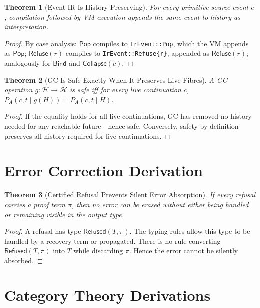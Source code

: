 \documentclass[12pt, a4paper, openany]{book}
\theoremstyle{plain}
\newtheorem{theorem}{Theorem}[chapter]
\theoremstyle{definition}
\theoremstyle{remark}
\newcommand{\Pop}{\mathsf{Pop}}
\newcommand{\Refuse}{\mathsf{Refuse}}
\newcommand{\Bind}{\mathsf{Bind}}
\newcommand{\Collapse}{\mathsf{Collapse}}
\newcommand{\calH}{\mathcal{H}}
\newcommand{\Rfsd}{\mathsf{Refused}}
\begin{document}
\begin{theorem}[Event IR Is History-Preserving]
For every primitive source event $e$, compilation followed by VM execution appends
the same event to history as interpretation.
\end{theorem}

\begin{proof}
By case analysis: $\Pop$ compiles to \texttt{IrEvent::Pop}, which the VM appends
as $\Pop$; $\Refuse(r)$ compiles to \texttt{IrEvent::Refuse\{r\}}, appended as
$\Refuse(r)$; analogously for $\Bind$ and $\Collapse(c)$.
\end{proof}

\begin{theorem}[GC Is Safe Exactly When It Preserves Live Fibres]
A GC operation $g : \calH \to \calH$ is safe iff for every live continuation $c$,
$P_A(c, t \mid g(H)) = P_A(c, t \mid H)$.
\end{theorem}

\begin{proof}
If the equality holds for all live continuations, GC has removed no history needed
for any reachable future---hence safe. Conversely, safety by definition preserves
all history required for live continuations.
\end{proof}

\section{Error Correction Derivation}

\begin{theorem}[Certified Refusal Prevents Silent Error Absorption]
If every refusal carries a proof term $\pi$, then no error can be erased without
either being handled or remaining visible in the output type.
\end{theorem}

\begin{proof}
A refusal has type $\Rfsd(T, \pi)$. The typing rules allow this type to be handled
by a recovery term or propagated. There is no rule converting $\Rfsd(T, \pi)$ into
$T$ while discarding $\pi$. Hence the error cannot be silently absorbed.
\end{proof}

\section{Category Theory Derivations}
\end{document}
